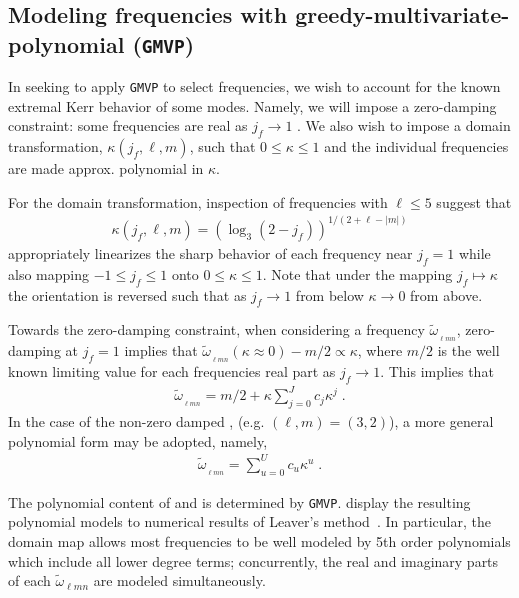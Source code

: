 \documentclass[twocolumn,aps,prd,floatfix,preprintnumbers,a4paper,nofootinbib,
superscriptaddress,10pt]{revtex4-1}
\newcommand{\cw}{\tilde{\omega}}
\def\jf{j_f}
\def\lmn{_{\ell m n}}
\def\gmvp#1{greedy-multivariate-polynomial#1
  (\texttt{GMVP}#1)\gdef\gmvp{\texttt{GMVP}}}
\begin{document}
\subsection{Modeling \qnm{} frequencies with \gmvp{}}
%
%
%
In seeking to apply \gmvp{} to select \qnm{} frequencies, we wish to account for the known extremal Kerr behavior of some modes.
%
Namely, we will impose a zero-damping constraint: some frequencies are real as $\jf \rightarrow 1$ \cite{Zimmerman:2015trm}.
%
We also wish to impose a domain transformation, $\kappa(\jf,\ell,m)$, such that $0 \leq \kappa \leq 1$ and the individual \qnm{} frequencies are made approx. polynomial in $\kappa$.
%
\par For the domain transformation, inspection of \qnm{} frequencies with $\ell \leq 5$ suggest that
%
\begin{align}
  \label{eq:kappa}
  \kappa(\jf,\ell,m) = \left( \log_3( 2 - \jf ) \right)^{1/(2+\ell-|m|)}
\end{align}
%
appropriately linearizes the sharp behavior of each frequency near $\jf=1$ while also mapping $-1 \le \jf \le 1$ onto $0 \le \kappa \le 1$. Note that under the mapping $j_f \mapsto \kappa$ the orientation is reversed such that as $j_f \rightarrow 1$ from below $\kappa \rightarrow 0$ from above.
%
\par Towards the zero-damping constraint, when considering a \qnm{} frequency $\cw_{\lmn}$, zero-damping at $\jf=1$ implies that $\cw_{\lmn}(\kappa \approx 0)-m/2 \propto \kappa$, where $m/2$ is the well known limiting value for each \qnm{} frequencies real part as $\jf\rightarrow 1$.
%
This implies that
%
\begin{align}
  \label{eq:zd}
  \cw_{\lmn} = m/2 + \kappa \sum_{j=0}^{J} c_j \kappa^j \; .
\end{align}
%
In the case of the non-zero damped , (e.g. $(\ell,m)=(3,2)$), a more general polynomial form may be adopted, namely,
%
\begin{align}
  \label{eq:nzd}
  \cw_{\lmn} = \sum_{u=0}^{U} c_u \kappa^u \; .
\end{align}
%
\par The polynomial content of  and  is determined by \gmvp{}.
%
 display the resulting polynomial models to numerical results of Leaver's method~\cite{Leaver85}.
%
In particular, the domain map allows most \qnm{} frequencies to be well modeled by 5th order polynomials which include all lower degree terms; concurrently, the real and imaginary parts of each $\cw\lmn$ are modeled simultaneously.
\end{document}
